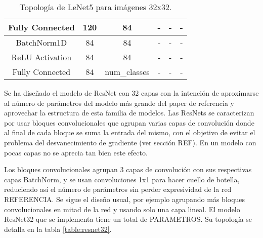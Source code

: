 \begin{table}[]
\begin{tabular}{|c|cc|c|cc|}
Fully Connected                & \multicolumn{1}{c|}{120}   & 84           & -                                & \multicolumn{1}{c|}{-} & -      \\ \hline
BatchNorm1D                    & \multicolumn{1}{c|}{84}    & 84           & -                                & \multicolumn{1}{c|}{-} & -      \\ \hline
ReLU Activation                & \multicolumn{1}{c|}{84}    & 84           & -                                & \multicolumn{1}{c|}{-} & -      \\ \hline
Fully Connected                & \multicolumn{1}{c|}{84}    & num\_classes & -                                & \multicolumn{1}{c|}{-} & -      \\ \hline
\end{tabular}

\caption{Topología de LeNet5 para imágenes 32x32.}
\label{table:lenet5}
\end{table}


Se ha diseñado el modelo de ResNet con 32 capas con la intención de aproximarse al número de parámetros del modelo más grande del paper de referencia y aprovechar la estructura de esta familia de modelos. Las ResNets se caracterizan por usar bloques convolucionales que agrupan varias capas de convolución donde al final de cada bloque se suma la entrada del mismo, con el objetivo de evitar el problema del desvanecimiento de gradiente (ver sección REF). En un modelo con pocas capas no se aprecia tan bien este efecto.

Los bloques convolucionales agrupan 3 capas de convolución con sus respectivas capas BatchNorm, y se usan convoluciones 1x1 para hacer cuello de botella, reduciendo así el número de parámetros sin perder expresividad de la red REFERENCIA. Se sigue el diseño usual, por ejemplo agrupando más bloques convolucionales en mitad de la red y usando solo una capa lineal. El modelo ResNet32 que se implementa tiene un total de PARAMETROS. Su topología se detalla en la tabla \ref{table:resnet32}.



